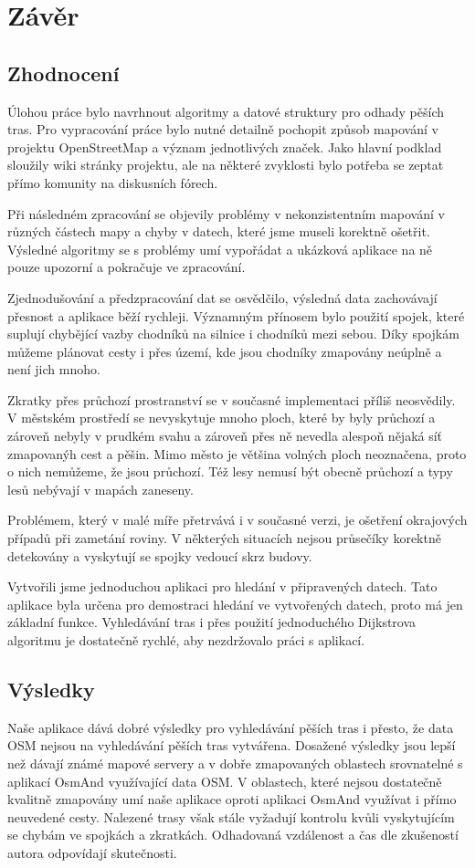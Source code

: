 \chapter*{Závěr}

\section{Zhodnocení}
Úlohou práce bylo navrhnout algoritmy a datové struktury pro odhady pěších tras.
Pro vypracování práce bylo nutné detailně pochopit způsob mapování v projektu
OpenStreetMap a význam jednotlivých značek. Jako hlavní podklad sloužily wiki
stránky projektu, ale na některé zvyklosti bylo potřeba se zeptat přímo komunity na
diskusních fórech. 

Při následném zpracování se objevily problémy v nekonzistentním mapování v
různých částech mapy a chyby v datech, které jsme museli korektně ošetřit.
Výsledné algoritmy se s problémy umí vypořádat a ukázková aplikace na ně pouze
upozorní a pokračuje ve zpracování. 

Zjednodušování a předzpracování dat se osvědčilo, výsledná data zachovávají
přesnost a aplikace běží rychleji. Významným přínosem bylo použití spojek, které
suplují chybějící vazby chodníků na silnice i chodníků mezi sebou. Díky spojkám
můžeme plánovat cesty i přes území, kde jsou chodníky zmapovány neúplně a není
jich mnoho. 

Zkratky přes průchozí prostranství se v současné implementaci příliš neosvědily.
V městském prostředí se nevyskytuje mnoho ploch, které by byly průchozí a
zároveň nebyly v prudkém svahu a zároveň přes ně nevedla alespoň nějaká síť
zmapovanýh cest a pěšin. Mimo město je většina volných ploch neoznačena, proto o
nich nemůžeme, že jsou průchozí. Též lesy nemusí být obecně průchozí a typy lesů
nebývají v mapách zaneseny. 

Problémem, který v malé míře přetrvává i v současné verzi, je ošetření
okrajových případů při zametání roviny. V některých situacích nejsou
průsečíky korektně detekovány a vyskytují se spojky vedoucí skrz budovy.  

Vytvořili jsme jednoduchou aplikaci pro hledání v připravených datech. Tato
aplikace byla určena pro demostraci hledání ve vytvořených datech, proto má jen
základní funkce. Vyhledávání tras i přes použití jednoduchého Dijkstrova
algoritmu je dostatečně rychlé, aby nezdržovalo práci s aplikací. 

\section{Výsledky}
Naše aplikace dává dobré výsledky pro vyhledávání pěších tras i přesto, že data
OSM nejsou na vyhledávání pěších tras vytvářena. Dosažené výsledky jsou lepší
než dávají známé mapové servery a v dobře zmapovaných oblastech srovnatelné s
aplikací OsmAnd využívající data OSM. V oblastech, které nejsou dostatečně
kvalitně zmapovány umí naše aplikace oproti aplikaci OsmAnd využívat i přímo
neuvedené cesty.  Nalezené trasy však stále vyžadují kontrolu kvůli vyskytujícím
se chybám ve spojkách a zkratkách.  Odhadovaná vzdálenost a čas dle zkušeností
autora odpovídají skutečnosti. 


